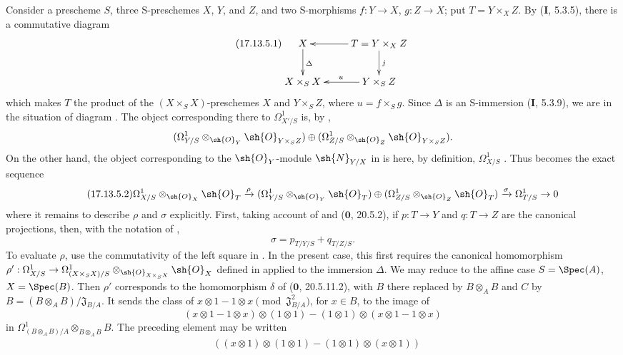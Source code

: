 \begin{env}[17.13.5]
\label{IV.17.13.5}
Consider a prescheme $S$, three S-preschemes $X$, $Y$, and $Z$, and two S-morphisms $f:Y\to X$, $g:Z\to X$; put $T=Y\times_XZ$.
By (\textbf{I}, 5.3.5), there is a commutative diagram
\[
\label{IV.17.13.5.1}
\tag{17.13.5.1}
\xymatrix{
  X \ar[d]^{\Delta} & T=Y\times_X Z \ar[l] \ar[d]^{j} \\
  X\times_S X & Y\times_S Z \ar[l]_{u}
}
\]
which makes $T$ the product of the $(X\times_SX)$-preschemes $X$ and $Y\times_SZ$, where $u=f\times_Sg$.
Since $\Delta$ is an S-immersion (\textbf{I}, 5.3.9), we are in the situation of diagram .
The object corresponding there to $\Omega^1_{X'/S}$ is, by ,
\[
  (\Omega^1_{Y/S}\otimes_{\sh{O}_Y}\sh{O}_{Y\times_SZ})
  \oplus
  (\Omega^1_{Z/S}\otimes_{\sh{O}_Z}\sh{O}_{Y\times_SZ}).
\]
On the other hand, the object corresponding to the $\sh{O}_Y$-module $\sh{N}_{Y/X}$ in  is here, by definition, $\Omega^1_{X/S}$ .
Thus  becomes the exact sequence
\[
\label{IV.17.13.5.2}
\tag{17.13.5.2}
\Omega^1_{X/S}\otimes_{\sh{O}_X}\sh{O}_T \xrightarrow{\rho}
(\Omega^1_{Y/S}\otimes_{\sh{O}_Y}\sh{O}_T)\oplus
(\Omega^1_{Z/S}\otimes_{\sh{O}_Z}\sh{O}_T)
\xrightarrow{\sigma} \Omega^1_{T/S} \to 0
\]
where it remains to describe $\rho$ and $\sigma$ explicitly.
First, taking account of  and ($\mathbf{0}$, 20.5.2), if $p:T\to Y$ and $q:T\to Z$ are the canonical projections, then, with the notation of ,
\[
\label{IV.17.13.5.3}
\tag{17.13.5.3}
\sigma = p_{T/Y/S} + q_{T/Z/S}.
\]
To evaluate $\rho$, use the commutativity of the left square in .
In the present case, this first requires the canonical homomorphism
$\rho': \Omega^1_{X/S} \to \Omega^1_{(X\times_S X)/S}\otimes_{\sh{O}_{X\times_S X}}\sh{O}_X$
defined in  applied to the immersion $\Delta$.
We may reduce to the affine case $S=\Spec(A)$, $X=\Spec(B)$.
Then $\rho'$ corresponds to the homomorphism $\delta$ of ($\mathbf{0}$, 20.5.11.2), with $B$ there replaced by $B\otimes_AB$ and $C$ by
$B=(B\otimes_AB)/\mathfrak J_{B/A}$.
It sends the class of
$x\otimes1-1\otimes x\pmod{\mathfrak J_{B/A}^2}$, for $x\in B$, to the image of
\[
  (x\otimes1-1\otimes x)\otimes(1\otimes1)
  -(1\otimes1)\otimes(x\otimes1-1\otimes x)
\]
in $\Omega^1_{(B\otimes_AB)/A}\otimes_{B\otimes_AB}B$.
The preceding element may be written
\[
\begin{split}
 &((x\otimes1)\otimes(1\otimes1)-(1\otimes1)\otimes(x\otimes1))\\

\end{split}\]
\end{env}

